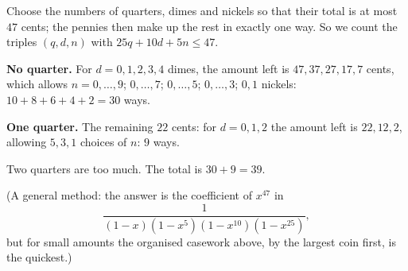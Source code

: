 Choose the numbers of quarters, dimes and nickels so that their total is at most $47$ cents; the pennies then make up the rest in exactly one way. So we count the triples $(q,d,n)$ with $25q+10d+5n\le47$.

\textbf{No quarter.} For $d=0,1,2,3,4$ dimes, the amount left is $47,37,27,17,7$ cents, which allows $n=0,\dots,9$; $0,\dots,7$; $0,\dots,5$; $0,\dots,3$; $0,1$ nickels: $10+8+6+4+2=30$ ways.

\textbf{One quarter.} The remaining $22$ cents: for $d=0,1,2$ the amount left is $22,12,2$, allowing $5,3,1$ choices of $n$: $9$ ways.

Two quarters are too much. The total is $30+9=\boxed{39}$.

(A general method: the answer is the coefficient of $x^{47}$ in
\[
\dfrac{1}{(1-x)\left(1-x^5\right)\left(1-x^{10}\right)\left(1-x^{25}\right)},
\]
but for small amounts the organised casework above, by the largest coin first, is the quickest.)
